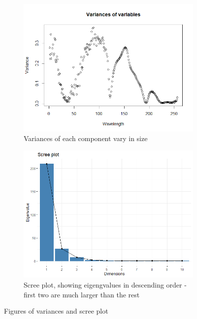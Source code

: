 \documentclass[12pt]{article}
\begin{document}
\begin{figure}[h!]
    \begin{subfigure}[b]{0.5\linewidth}
        \centering
        \includegraphics[width=\textwidth]{../images/variances.png}
     \caption{Variances of each component vary in size}\label{fig:var}
    \end{subfigure}%
    \begin{subfigure}[b]{0.5\linewidth}
        \centering
     \includegraphics[width=\textwidth]{../images/screePlot.png}
     \caption{Scree plot, showing eigengvalues in descending order - first two are much larger than the rest}\label{fig:scree}
    \end{subfigure}%
   \caption{Figures of variances and scree plot}
\end{figure}
\end{document}
